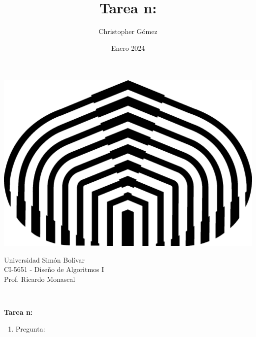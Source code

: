 \documentclass[letterpaper, 12pt]{article}
\title{Tarea n:}
\author{Christopher Gómez}
\date{Enero 2024}
\begin{document}
\parbox[t]{.5\linewidth}{
    \centering
    \includegraphics[scale=0.4]{logo.png}
    \begin{center}
        Universidad Simón Bolívar \\
        CI-5651 - Diseño de Algoritmos I \\
        Prof. Ricardo Monascal \\
    \end{center}
}
\hfill {}

\phantom{This text will be invisible} \\
\centerline {\textbf{Tarea n:}}
\justify

\begin{enumerate}


\item Pregunta:






\end{enumerate} \vspace{4mm}
\end{document}
